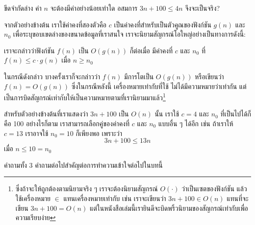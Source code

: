 \begin{quiz}{ขีดจำกัด{\wbr}ล่าง}
ค่า $n$ จะ{\wbr}ต้อง{\wbr}มี{\wbr}ค่า{\wbr}อย่าง{\wbr}น้อย{\wbr}เท่าใด อสมการ $3n+100\leq 4n$ จึง{\wbr}จะ{\wbr}เป็นจริง?
\end{quiz}

จาก{\wbr}ตัวอย่าง{\wbr}ข้างต้น เรา{\wbr}ใช้{\wbr}ค่าคงที่{\wbr}สอง{\wbr}ตัว{\wbr}คือ $c$ เป็น{\wbr}ค่าคงที่{\wbr}สำหรับ{\wbr}เป็น{\wbr}ตัวคูณ{\wbr}ของ{\wbr}ฟังก์ชัน{\wbr}
$g(n)$ และ $n_0$ เพื่อ{\wbr}ระบุ{\wbr}ขอบเขต{\wbr}ล่าง{\wbr}ของ{\wbr}ขนาด{\wbr}ข้อมูล{\wbr}ที่{\wbr}เรา{\wbr}สนใจ{\wbr}
เรา{\wbr}จะ{\wbr}นิยาม{\wbr}สัญกรณ์{\wbr}โอ{\wbr}ใหญ่{\wbr}อย่าง{\wbr}เป็นทางการ{\wbr}ดังนี้:

เรา{\wbr}จะ{\wbr}กล่าว{\wbr}ว่า{\wbr}ฟังก์ชัน $f(n)$ เป็น $O(g(n))$ ก็{\wbr}ต่อเมื่อ มี{\wbr}ค่าคงที่ $c$ และ $n_0$ ที่{\wbr}
$f(n) \leq c\cdot g(n)$ เมื่อ $n\geq n_0$

ใน{\wbr}กรณี{\wbr}ดังกล่าว บาง{\wbr}ครั้ง{\wbr}เรา{\wbr}ก็{\wbr}จะ{\wbr}กล่าว{\wbr}ว่า $f(n)$ มี{\wbr}การ{\wbr}โต{\wbr}เป็น $O(g(n))$ หรือ{\wbr}เขียน{\wbr}ว่า{\wbr}
$f(n)=O(g(n))$ ซึ่ง{\wbr}ใน{\wbr}กรณี{\wbr}หลัง{\wbr}นี้ เครื่องหมาย{\wbr}เท่า{\wbr}กับ{\wbr}ที่{\wbr}ใช้ ไม่{\wbr}ได้{\wbr}มี{\wbr}ความหมาย{\wbr}ว่า{\wbr}เท่า{\wbr}กัน{\wbr}
แต่{\wbr}เป็น{\wbr}การ{\wbr}บิด{\wbr}สัญกรณ์{\wbr}เท่า{\wbr}กับ{\wbr}ให้{\wbr}เป็น{\wbr}ความหมาย{\wbr}ตาม{\wbr}ที่{\wbr}เรา{\wbr}นิยาม{\wbr}มา{\wbr}แล้ว\footnote{ซึ่ง{\wbr}ถ้า{\wbr}จะ{\wbr}ให้{\wbr}ถูกต้อง{\wbr}ตาม{\wbr}นิยาม{\wbr}จริง{\wbr}
  ๆ เรา{\wbr}จะ{\wbr}ต้อง{\wbr}นิยาม{\wbr}สัญกรณ์ $O(\cdot)$ ว่า{\wbr}เป็น{\wbr}เซต{\wbr}ของ{\wbr}ฟังก์ชัน แล้ว{\wbr}ใช้{\wbr}เครื่องหมาย $\in$
  แทน{\wbr}เครื่องหมาย{\wbr}เท่า{\wbr}กับ เช่น เรา{\wbr}จะ{\wbr}เขียน{\wbr}ว่า $3n+100\in O(n)$ แทน{\wbr}ที่{\wbr}จะ{\wbr}เขียน{\wbr}
  $3n+100=O(n)$
  แต่{\wbr}ใน{\wbr}หนังสือ{\wbr}เล่ม{\wbr}นี้{\wbr}เรา{\wbr}ยินดี{\wbr}จะ{\wbr}บิด{\wbr}พ{\wbr}ริ้ว{\wbr}นิยาม{\wbr}ของ{\wbr}สัญกรณ์{\wbr}เท่า{\wbr}กับ{\wbr}เพื่อ{\wbr}ความ{\wbr}เรียบ{\wbr}ง่าย}

สำหรับ{\wbr}ตัวอย่าง{\wbr}ข้างต้น{\wbr}ที่{\wbr}เรา{\wbr}แสดง{\wbr}ว่า $3n+100$ เป็น $O(n)$ นั้น เรา{\wbr}ใช้ $c=4$ และ{\wbr}
$n_0$ ที่{\wbr}เป็น{\wbr}ไป{\wbr}ได้{\wbr}ก็{\wbr}คือ 100 อย่างไรก็ตาม เรา{\wbr}สามารถ{\wbr}เลือก{\wbr}คู่{\wbr}ของ{\wbr}ค่าคงที่ $c$ และ $n_0$
แบบ{\wbr}อื่น ๆ ได้{\wbr}อีก เช่น ถ้า{\wbr}เรา{\wbr}ให้ $c=13$ เรา{\wbr}อาจ{\wbr}ใช้ $n_0=10$ ก็{\wbr}เพียงพอ เพราะว่า{\wbr}
\[
3n+100 \leq 13n
\]
เมื่อ $n\leq 10 = n_0$

คำถาม{\wbr}ทั้ง 3 คำถาม{\wbr}ต่อไป{\wbr}สำคัญ{\wbr}ต่อ{\wbr}การ{\wbr}ทำ{\wbr}ความ{\wbr}เข้าใจ{\wbr}ต่อไป{\wbr}ใน{\wbr}บท{\wbr}นี้{\wbr}

